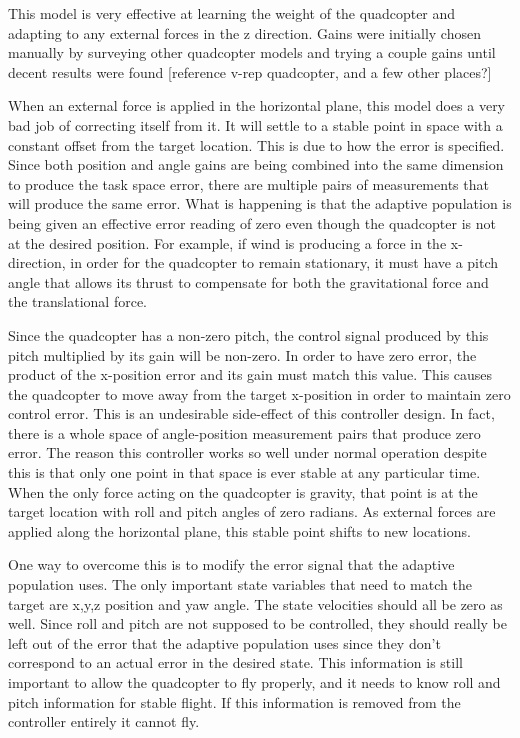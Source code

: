 \documentclass[letterpaper,12pt,titlepage,oneside,final]{book}
\begin{document}
This model is very effective at learning the weight of the quadcopter and adapting to any external forces in the z direction. 
Gains were initially chosen manually by surveying other quadcopter models and trying a couple gains until decent results were found [reference v-rep quadcopter, and a few other places?]

When an external force is applied in the horizontal plane, this model does a very bad job of correcting itself from it. 
It will settle to a stable point in space with a constant offset from the target location. This is due to how the error is specified. 
Since both position and angle gains are being combined into the same dimension to produce the task space error, there are multiple pairs of measurements that will produce the same error. 
What is happening is that the adaptive population is being given an effective error reading of zero even though the quadcopter is not at the desired position. 
For example, if wind is producing a force in the x-direction, in order for the quadcopter to remain stationary, it must have a pitch angle that allows its thrust to compensate for both the gravitational force and the translational force.


Since the quadcopter has a non-zero pitch, the control signal produced by this pitch multiplied by its gain will be non-zero. 
In order to have zero error, the product of the x-position error and its gain must match this value. 
This causes the quadcopter to move away from the target x-position in order to maintain zero control error. 
This is an undesirable side-effect of this controller design. 
In fact, there is a whole space of angle-position measurement pairs that produce zero error. 
The reason this controller works so well under normal operation despite this is that only one point in that space is ever stable at any particular time. 
When the only force acting on the quadcopter is gravity, that point is at the target location with roll and pitch angles of zero radians. 
As external forces are applied along the horizontal plane, this stable point shifts to new locations.


One way to overcome this is to modify the error signal that the adaptive population uses. 
The only important state variables that need to match the target are x,y,z position and yaw angle. 
The state velocities should all be zero as well. 
Since roll and pitch are not supposed to be controlled, they should really be left out of the error that the adaptive population uses since they don’t correspond to an actual error in the desired state. 
This information is still important to allow the quadcopter to fly properly, and it needs to know roll and pitch information for stable flight. If this information is removed from the controller entirely it cannot fly.
\end{document}
